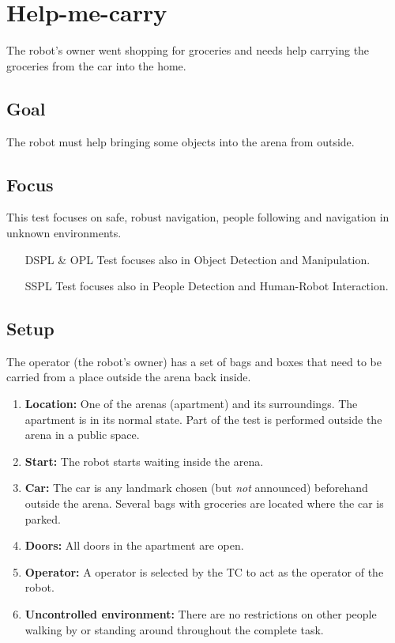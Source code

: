 \section{Help-me-carry}
The robot's owner went shopping for groceries and needs help carrying the groceries from the car into the home.

\subsection{Goal}
The robot must help bringing some objects into the arena from outside.

\subsection{Focus}
This test focuses on safe, robust navigation, people following and navigation in unknown environments.
\begin{itemize}[leftmargin=3cm]
  \item[DSPL \& OPL] Test focuses also in Object Detection and Manipulation.
  \item[SSPL] Test focuses also in People Detection and Human-Robot Interaction.
\end{itemize}

\subsection{Setup}
The operator (the robot's owner) has a set of bags and boxes that need to be carried from a place outside the arena back inside. 

\begin{enumerate}
  \item \textbf{Location:} One of the arenas (apartment) and its surroundings. The apartment is in its normal state. Part of the test is performed outside the arena in a public space.
  \item \textbf{Start:} The robot starts waiting inside the arena.
  \item \textbf{Car:} The car is any landmark chosen (but \emph{not} announced) beforehand outside the arena. Several bags with groceries are located where the car is parked. 
  \item \textbf{Doors:} All doors in the apartment are open.
  \item \textbf{Operator:} A  operator is selected by the TC to act as the operator of the robot. 
  \item \textbf{Uncontrolled environment:} There are no restrictions on other people walking by or standing around throughout the complete task. 
\end{enumerate}

